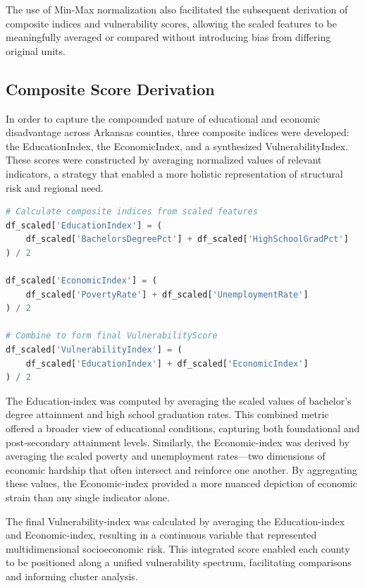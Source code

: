 \documentclass{llncs}
\begin{document}
The use of Min-Max normalization also facilitated the subsequent derivation of composite indices and vulnerability scores, allowing the scaled features to be meaningfully averaged or compared without introducing bias from differing original units.

\subsection{Composite Score Derivation}

In order to capture the compounded nature of educational and economic disadvantage across Arkansas counties, three composite indices were developed: the EducationIndex, the EconomicIndex, and a synthesized VulnerabilityIndex. These scores were constructed by averaging normalized values of relevant indicators, a strategy that enabled a more holistic representation of structural risk and regional need.

\begin{lstlisting}[language=Python, caption={Deriving Composite Vulnerability Scores}]
# Calculate composite indices from scaled features
df_scaled['EducationIndex'] = (
    df_scaled['BachelorsDegreePct'] + df_scaled['HighSchoolGradPct']
) / 2

df_scaled['EconomicIndex'] = (
    df_scaled['PovertyRate'] + df_scaled['UnemploymentRate']
) / 2

# Combine to form final VulnerabilityScore
df_scaled['VulnerabilityIndex'] = (
    df_scaled['EducationIndex'] + df_scaled['EconomicIndex']
) / 2
\end{lstlisting}

The Education-index was computed by averaging the scaled values of bachelor’s degree attainment and high school graduation rates. This combined metric offered a broader view of educational conditions, capturing both foundational and post-secondary attainment levels. Similarly, the Economic-index was derived by averaging the scaled poverty and unemployment rates—two dimensions of economic hardship that often intersect and reinforce one another. By aggregating these values, the Economic-index provided a more nuanced depiction of economic strain than any single indicator alone.

The final Vulnerability-index was calculated by averaging the Education-index and Economic-index, resulting in a continuous variable that represented multidimensional socioeconomic risk. This integrated score enabled each county to be positioned along a unified vulnerability spectrum, facilitating comparisons and informing cluster analysis.
\end{document}
